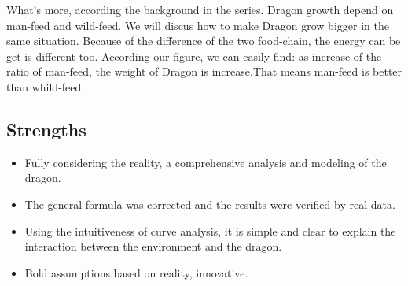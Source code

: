 \documentclass[12pt]{article}
\begin{document}
What's more, according the background in the series. Dragon growth depend on man-feed and wild-feed. We will discus how to make Dragon grow bigger in the same situation. Because of the difference of the two food-chain, the energy can be get is different too. According our figure, we can easily find: as increase of the ratio of man-feed, the weight of Dragon is increase.That means man-feed is better than whild-feed.
\subsection{Strengths}%
\begin{itemize}
    \item Fully considering the reality, a comprehensive analysis and modeling of the dragon.
	 \item The general formula was corrected and the results were verified by real data.
	 \item Using the intuitiveness of curve analysis, it is simple and clear to explain the interaction between the environment and the dragon.
	 \item Bold assumptions based on reality, innovative.
\end{itemize}
\end{document}
